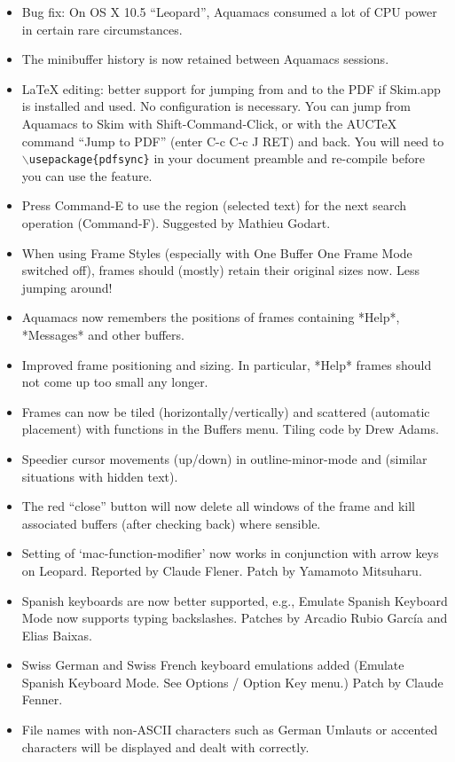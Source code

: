 \begin{itemize}

\item Bug fix: On OS X 10.5 ``Leopard'', Aquamacs consumed a lot of CPU power in certain rare circumstances.
\item The minibuffer history is now retained between Aquamacs sessions.
\item LaTeX editing: better support for jumping from and to the PDF if Skim.app is installed and used. No configuration is necessary. You can jump from Aquamacs to Skim with Shift-Command-Click, or with the AUCTeX command ``Jump to PDF'' (enter C-c C-c J RET) and back. You will need to {\tt $\backslash$usepackage\{pdfsync\}} in your document preamble and re-compile before you can use the feature.    
\item Press Command-E to use the region (selected text) for the next  search operation (Command-F).
Suggested by Mathieu Godart.
\item When using Frame Styles (especially with One Buffer One Frame Mode switched off), frames should (mostly) retain their original sizes now. Less jumping around!
\item Aquamacs now remembers the positions of frames containing *Help*, *Messages* and other buffers.
\item Improved frame positioning and sizing. In particular, *Help* frames should not come up too small any longer.
\item Frames can now be tiled (horizontally/vertically) and scattered (automatic placement) with functions in the Buffers menu.
Tiling code by Drew Adams.
\item Speedier cursor movements (up/down) in outline-minor-mode and (similar situations with hidden text).
\item The red ``close'' button will now delete all windows of the frame and kill associated buffers (after checking back) where sensible.
\item Setting of `mac-function-modifier' now works in conjunction with arrow keys on Leopard.
Reported by Claude Flener. Patch by Yamamoto Mitsuharu.
\item Spanish keyboards are now better supported, e.g., Emulate Spanish Keyboard Mode now supports typing backslashes.
Patches by Arcadio Rubio García and Elias Baixas.
\item Swiss German and Swiss French keyboard emulations added (Emulate Spanish Keyboard Mode. See Options / Option Key menu.)
Patch by Claude Fenner.
\item File names with non-ASCII characters such as German Umlauts or accented characters will be displayed and dealt with correctly. 

\end{itemize}
